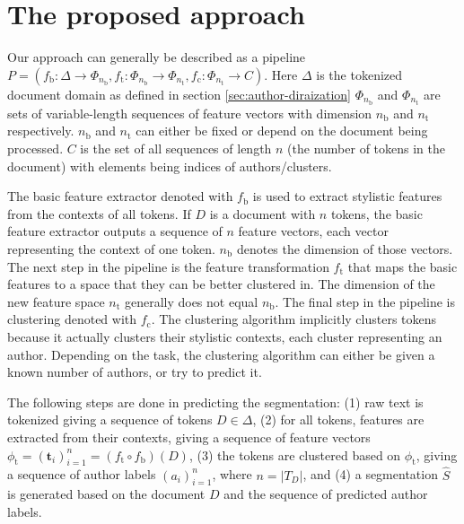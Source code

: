 \documentclass[10pt, a4paper]{article}
\newcommand{\vect}[1]{\bm{#1}}
\begin{document}
\section{The proposed approach} \label{sec:the-proposed-approach}

Our approach can generally be described as a pipeline $P = (f_\mathrm{b}:\Delta\rightarrow \Phi_{n_\mathrm{b}}, f_\mathrm{t}:\Phi_{n_\mathrm{b}}\rightarrow \Phi_{n_\mathrm{t}}, f_\mathrm{c}:\Phi_{n_\mathrm{t}}\rightarrow C)$. Here $\Delta$ is the tokenized document domain as defined in section \ref{sec:author-diraization} $\Phi_{n_\mathrm{b}}$ and $\Phi_{n_\mathrm{t}}$ are sets of variable-length sequences of feature vectors with dimension $n_\mathrm{b}$ and $n_\mathrm{t}$ respectively. $n_\mathrm{b}$ and $n_\mathrm{t}$ can either be fixed or depend on the document being processed. $C$ is the set of all sequences of length $n$ (the number of tokens in the document) with elements being indices of authors/clusters.

The basic feature extractor denoted with $f_\mathrm{b}$ is used to extract stylistic features from the contexts of all tokens. If $D$ is a document with $n$ tokens, the basic feature extractor outputs a sequence of $n$ feature vectors, each vector representing the context of one token. $n_\mathrm{b}$ denotes the dimension of those vectors. The next step in the pipeline is the feature transformation $f_\mathrm{t}$ that maps the basic features to a space that they can be better clustered in. The dimension of the new feature space $n_\mathrm{t}$ generally does not equal $n_\mathrm{b}$. The final step in the pipeline is clustering denoted with $f_\mathrm{c}$. The clustering algorithm implicitly clusters tokens because it actually clusters their stylistic contexts, each cluster representing an author. Depending on the task, the clustering algorithm can either be given a known number of authors, or try to predict it.

The following steps are done in predicting the segmentation: (1) raw text is tokenized giving a sequence of tokens $D\in\Delta$, (2) for all tokens, features are extracted from their contexts, giving a sequence of feature vectors $\phi_\mathrm{t} = (\vect{t}_i)_{i=1}^n = (f_\mathrm{t}\circ f_\mathrm{b})(D)$, (3) the tokens are clustered based on $\phi_\mathrm{t}$, giving a sequence of author labels $(a_i)_{i=1}^{n}$, where $n=|T_D|$, and (4) a segmentation $\hat{S}$ is generated based on the document $D$ and the sequence of predicted author labels.
\end{document}
